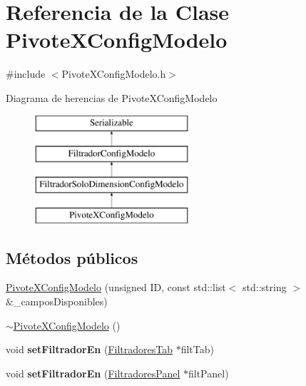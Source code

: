 \hypertarget{classPivoteXConfigModelo}{\section{\-Referencia de la \-Clase \-Pivote\-X\-Config\-Modelo}
\label{classPivoteXConfigModelo}
}


{\ttfamily \#include $<$\-Pivote\-X\-Config\-Modelo.\-h$>$}

\-Diagrama de herencias de \-Pivote\-X\-Config\-Modelo\begin{figure}[H]
\begin{center}
\leavevmode
\includegraphics[height=4.000000cm]{classPivoteXConfigModelo}
\end{center}
\end{figure}
\subsection*{\-Métodos públicos}
\begin{DoxyCompactItemize}
\item 
\hyperlink{classPivoteXConfigModelo_a74e10d564aec196a6b9d0cc299d95f99}{\-Pivote\-X\-Config\-Modelo} (unsigned \-I\-D, const std\-::list$<$ std\-::string $>$ \&\-\_\-campos\-Disponibles)
\item 
\hyperlink{classPivoteXConfigModelo_a2bd3cb63a4552a8a459f5e457f3972f3}{$\sim$\-Pivote\-X\-Config\-Modelo} ()
\item 
\hypertarget{classPivoteXConfigModelo_a5e86ae0c4b17a849ee0268860c342a74}{void {\bfseries set\-Filtrador\-En} (\hyperlink{classFiltradoresTab}{\-Filtradores\-Tab} $\ast$filt\-Tab)}\label{classPivoteXConfigModelo_a5e86ae0c4b17a849ee0268860c342a74}

\item 
\hypertarget{classPivoteXConfigModelo_a649258e57fcad0bcb42bf59c07182b69}{void {\bfseries set\-Filtrador\-En} (\hyperlink{classFiltradoresPanel}{\-Filtradores\-Panel} $\ast$filt\-Panel)}\label{classPivoteXConfigModelo_a649258e57fcad0bcb42bf59c07182b69}

\end{DoxyCompactItemize}


